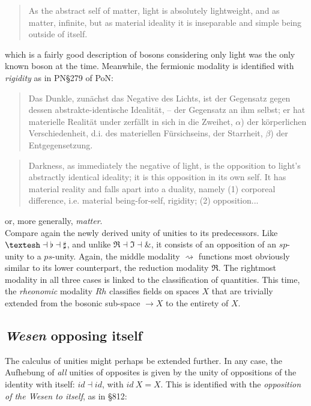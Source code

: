 \documentclass{article}
\begin{document}
\begin{quote}
    As the abstract self of matter, light is absolutely lightweight, and as matter, infinite, but as material ideality it is inseparable and simple being outside of itself. 
\end{quote}

which is a fairly good description of bosons considering only light was the only known boson at the time.
Meanwhile, the fermionic modality is identified with \emph{rigidity} as in PN§279 of PoN:

\begin{quote}
    Das Dunkle, zunächst das Negative des Lichts, ist der Gegensatz gegen dessen abstrakte-identische Idealität, – der Gegensatz an ihm selbst; er hat materielle Realität under zerfällt in sich in die Zweihet, $\alpha$) der körperlichen Verschiedenheit, d.i. des materiellen Fürsichseins, der Starrheit, $\beta$) der Entgegensetzung.
\end{quote}

\begin{quote}
    Darkness, as immediately the negative of light, is the opposition to light’s abstractly identical ideality; it is this opposition in its own self. It has material reality and falls apart into a duality, namely (1) corporeal difference, i.e. material being-for-self, rigidity; (2) opposition...
\end{quote}

or, more generally, \emph{matter}. \\

Compare again the newly derived unity of unities to its predecessors. Like
$\textrm{\textesh}\dashv\flat\dashv\sharp$, and unlike $\Re\dashv\Im\dashv\&$, it consists of an opposition of an
$sp$-unity to a $ps$-unity. Again, the middle modality $\rightsquigarrow$ functions most obviously similar to
its lower counterpart, the reduction modality $\Re$. The rightmost modality in all three cases is linked to the classification of quantities. This time, the \emph{rheonomic} modality $Rh$ classifies fields on spaces $X$ that
are trivially extended from the bosonic sub-space $\rightarrow X$ to the entirety of $X$. 


\subsection{\emph{Wesen} opposing itself}\label{Wesen}
The calculus of unities might perhaps be extended further. In any case, the Aufhebung of \emph{all} unities
of opposites is given by the unity of oppositions of the identity with itself: $id\dashv id$, with $id\ X=X$.
This is identified with the \emph{opposition of the \emph{Wesen} to itself}, as in §812:
\end{document}
